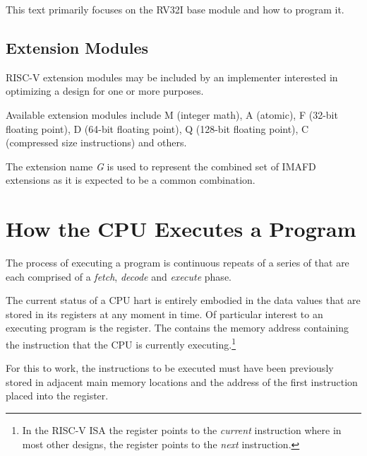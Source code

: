 This text primarily focuses on the RV32I base module and how to program it.


\subsection{Extension Modules}

RISC-V extension modules may be included by an implementer interested
in optimizing a design for one or more purposes.\cite[p.~4]{rvismv1v22:2017}

%
%
%
%
%
%
Available extension modules include M (integer math), A (atomic),
F (32-bit floating point), D (64-bit floating point), 
Q (128-bit floating point), C (compressed size instructions) and others.

%
The extension name {\em G} is used to represent the combined set of IMAFD
extensions as it is expected to be a common combination.




\section{How the CPU Executes a Program}

The process of executing a program is continuous repeats of a series of
 that are each comprised
of a {\em fetch}, {\em decode} and {\em execute} phase.
 
The current status of a CPU hart is entirely embodied in the data values that
are stored in its registers at any moment in time.  Of particular interest
to an executing program is the  register.  The  contains
the memory address containing the instruction that the CPU is currently 
executing.\footnote{In the RISC-V ISA the  register points to the 
{\em current} instruction where in most other designs, the 
register points to the {\em next} instruction.}

For this to work, the instructions to be executed must have been previously 
stored in adjacent main memory locations and the address of the first instruction 
placed into the  register.


